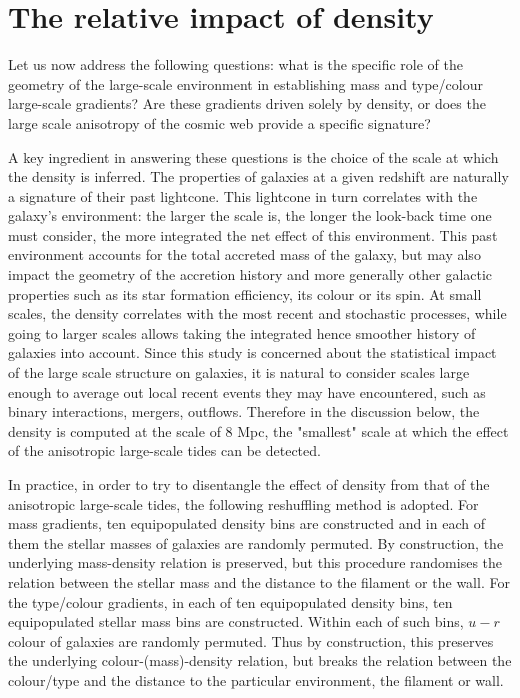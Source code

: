 \documentclass[useAMS,usenatbib]{mnras}
\begin{document}


\section{The relative impact of density}
\label{sec:density}
  
Let us now address the following questions:
what is the specific role of the geometry of the large-scale environment in establishing mass and type/colour large-scale gradients? Are these gradients driven solely by density, or does the large scale anisotropy of the cosmic web provide a specific signature? 
 

A key ingredient in answering these questions is the choice of the scale at which the density is inferred.
The properties of galaxies at a given redshift are naturally a signature of their past lightcone. This lightcone in turn correlates  with the galaxy's environment: the larger the scale is, the longer the look-back time one must consider, the more integrated the net effect of this environment. This past environment accounts for the total accreted mass of the galaxy, but may also impact the geometry of the accretion history and more generally other galactic properties such as its star formation efficiency, its colour or its spin.
At small scales,  the density correlates with 
the most recent and stochastic processes, while going to larger scales allows taking the integrated hence smoother history of galaxies into account. 
Since this study is concerned about the statistical impact of the large scale structure on  galaxies, it is natural to consider scales large enough to average out local recent events they may have encountered, such as binary interactions, mergers, outflows.
Therefore in the discussion below, the density is computed at the scale of 8 Mpc, the "smallest" scale at which the effect of the anisotropic large-scale tides can be detected.
  
In practice, in order to try to disentangle the effect of density from that of the anisotropic large-scale tides, the following reshuffling method \citep[e.g.][]{Malavasi2017} is adopted. For mass gradients, ten equipopulated density bins are constructed and in each of them the stellar masses of galaxies are randomly permuted.
By construction, the underlying mass-density relation is preserved, but this procedure randomises the relation between the stellar mass and the distance to the filament or the wall. 
For the type/colour gradients, in each of ten equipopulated density bins, ten equipopulated stellar mass bins are constructed. Within each of such bins, $u - r$ colour of galaxies are randomly permuted. Thus by construction, this preserves the underlying colour-(mass)-density relation, but  breaks the relation between the colour/type and the distance to the particular environment, the filament or wall.    
\end{document}

